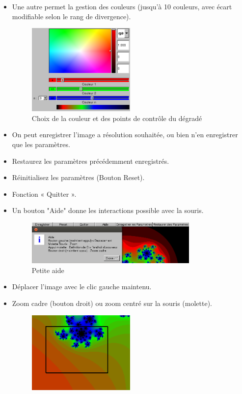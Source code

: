 \documentclass[a4paper,11pt]{article} \usepackage[T1]{fontenc} \usepackage[utf8]{inputenc} \usepackage[francais]{babel}
\begin{document}
\begin{itemize}
  \item Une autre permet la gestion des couleurs (jusqu'à 10 couleurs, avec écart modifiable selon le rang de divergence).
        \begin{figure}[H] \begin{center} \includegraphics[width=0.5\textwidth]{Images/ChoixCouleurs.png}
            \caption{Choix de la couleur et des points de contrôle du dégradé}
        \end{center} \end{figure}
  \item On peut enregistrer l'image a résolution souhaitée, ou bien n'en enregistrer que les paramètres.
  \item Restaurez les paramètres précédemment enregistrés.
  \item Réinitialisez les paramètres (Bouton Reset).
  \item Fonction « Quitter ».
  \item Un bouton "Aide" donne les interactions possible avec la souris.
        \begin{figure}[H] \begin{center} \includegraphics[width=0.8\textwidth]{Images/Aide.png}
            \caption{Petite aide}
        \end{center} \end{figure}
  \item Déplacer l’image avec le clic gauche maintenu.
  \item Zoom cadre (bouton droit) ou zoom centré sur la souris (molette).
        \begin{figure}[H] \begin{center} \includegraphics[width=0.5\textwidth]{Images/Cadre.png}

\end{center}
\end{figure}
\end{itemize}
\end{document}
